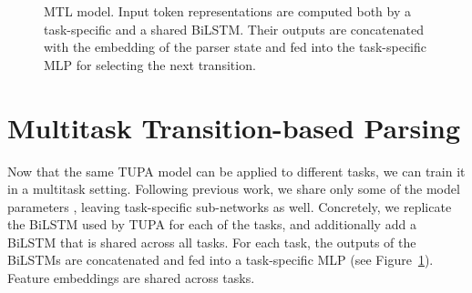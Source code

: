 \documentclass[11pt,a4paper]{article}
\begin{document}
\begin{figure}[t]
   \caption{MTL model.
      Input token representations are computed both by a task-specific and a shared BiLSTM.
      Their outputs are concatenated with the embedding of the parser state and fed into the task-specific MLP for selecting the next transition.
      }
   \label{fig:multi_model}
\end{figure}


\section{Multitask Transition-based Parsing}\label{sec:multitask}

Now that the same TUPA model can be applied to different tasks, 
we can train it in a multitask setting.
Following previous work, we share only some of the model parameters
\cite{N16-1179,P16-2038,C16-1013,C16-1059,C16-1179,E17-1005,P17-1186}, leaving task-specific
sub-networks as well.
Concretely, we replicate the BiLSTM used by TUPA for each of the tasks, and additionally add
a BiLSTM that is shared across all tasks. 
For each task, the outputs of the BiLSTMs are concatenated and
fed into a task-specific MLP (see Figure~\ref{fig:multi_model}).
Feature embeddings are shared across tasks.
\end{document}
